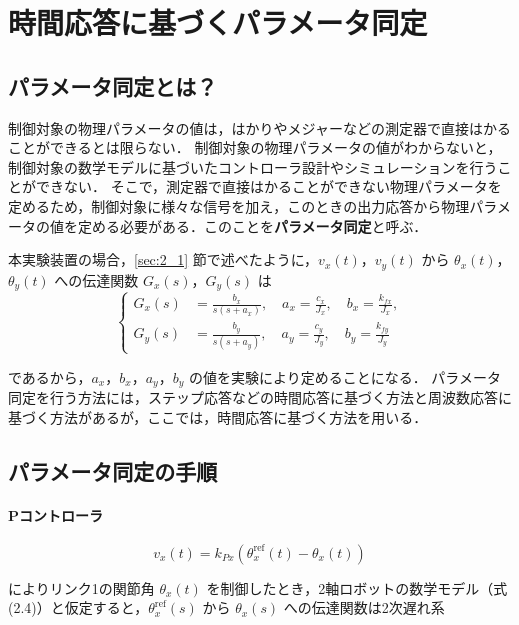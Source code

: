 \section{時間応答に基づくパラメータ同定}
\subsection{パラメータ同定とは？}

制御対象の物理パラメータの値は，はかりやメジャーなどの測定器で直接はかることができるとは限らない．
制御対象の物理パラメータの値がわからないと，制御対象の数学モデルに基づいたコントローラ設計やシミュレーションを行うことができない．
そこで，測定器で直接はかることができない物理パラメータを定めるため，制御対象に様々な信号を加え，このときの出力応答から物理パラメータの値を定める必要がある．このことを\textbf{パラメータ同定}と呼ぶ．

本実験装置の場合，\ref{sec:2_1} 節で述べたように，$v_x(t)$，$v_y(t)$ から $\theta_x(t)$，$\theta_y(t)$ への伝達関数 $G_x(s)$，$G_y(s)$ は
\begin{equation}
\left\{
\begin{aligned}
G_x(s) &= \frac{b_x}{s(s + a_x)}, \quad a_x = \frac{c_x}{J_x}, \quad b_x = \frac{k_{fx}}{J_x}, \\
G_y(s) &= \frac{b_y}{s(s + a_y)}, \quad a_y = \frac{c_y}{J_y}, \quad b_y = \frac{k_{fy}}{J_y}
\end{aligned}
\right.
\label{eq:gx_gy_transfer}
\end{equation}

であるから，$a_x$，$b_x$，$a_y$，$b_y$ の値を実験により定めることになる．
パラメータ同定を行う方法には，ステップ応答などの時間応答に基づく方法と周波数応答に基づく方法があるが，ここでは，時間応答に基づく方法を用いる．

\subsection{パラメータ同定の手順}

\paragraph{Pコントローラ}

\begin{equation}
    v_x(t) = k_{Px}(\theta_x^{\mathrm{ref}}(t) - \theta_x(t)) \tag{4.2}
\end{equation}

によりリンク1の関節角 $\theta_x(t)$ を制御したとき，2軸ロボットの数学モデル（式(2.4)）と仮定すると，$\theta_x^{\mathrm{ref}}(s)$ から $\theta_x(s)$ への伝達関数は2次遅れ系

